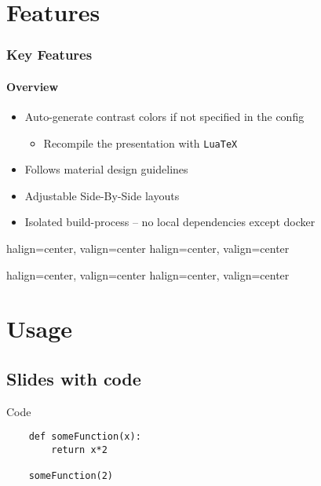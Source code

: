 \documentclass[lualatex]{beamer}
\begin{document}
\section{Features}
\begin{frame}
	\frametitle{Key Features}
	\framesubtitle{Overview}

	\begin{itemize}
		\item Auto-generate contrast colors if not specified in the config
		\begin{itemize}
			\item Recompile the presentation with \texttt{LuaTeX}
		\end{itemize}
		\item Follows material design guidelines
		\item Adjustable Side-By-Side layouts
		\item Isolated build-process -- no local dependencies except docker
	\end{itemize}
\end{frame}

\begin{frame}
	{halign=center, valign=center}
	{halign=center, valign=center}
\end{frame}

\begin{frame}
	{halign=center, valign=center}
	{halign=center, valign=center}
\end{frame}


\section{Usage}
\subsection{Slides with code}
\begin{frame}[fragile=singleslide]{Code}
	\begin{lstlisting}
	def someFunction(x):
		return x*2

	someFunction(2)
	\end{lstlisting}
\end{frame}
\end{document}
